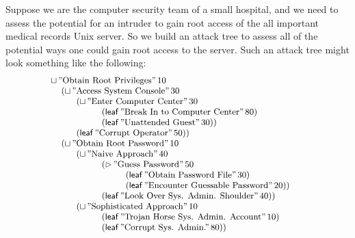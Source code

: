 \documentclass{llncs}
\begin{document}
Suppose we are the computer security team of a small hospital, and we
need to assess the potential for an intruder to gain root access of the
all important medical records Unix server.  So we build an attack tree
to assess all of the potential ways one could gain root access to the
server.  Such an attack tree might look something like the following:
\[
\small
  \begin{array}{lll}
    \sqcup\,\text{''Obtain Root Privileges''}\,10\\
    \,\,\,\,\,\,\,(\sqcup\,\text{''Access System Console''}\,30\\
    \,\,\,\,\,\,\,\,\,\,\,\,\,\,\begin{array}{lll}
    (\sqcup\,\text{''Enter Computer Center''}\,30\\
    \,\,\,\,\,\,\,\,\,\,\,\,\,\,\begin{array}{lll}
    (\mathsf{leaf}\,\text{''Break In to Computer Center''}\,80)\\
    (\mathsf{leaf}\,\text{''Unattended Guest''}\,30))\\
    \end{array}\\
    (\mathsf{leaf}\,\text{''Corrupt Operator''}\,50))\\
    \end{array}\\
    \,\,\,\,\,\,\,(\sqcup\,\text{''Obtain Root Password''}\,10\\
    \,\,\,\,\,\,\,\,\,\,\,\,\,\,\begin{array}{lll}
    (\sqcup\,\text{''Naive Approach''}\,40\\
    \,\,\,\,\,\,\,\,\,\,\,\,\,\,\begin{array}{lll}
    (\rhd\,\text{''Guess Password''}\,50\\
    \,\,\,\,\,\,\,\,\,\,\,\,\,\begin{array}{lll}
    (\mathsf{leaf}\,\text{''Obtain Password File''}\,30)\\
    (\mathsf{leaf}\,\text{''Encounter Guessable Password''}\,20))\\
    \end{array}\\
    (\mathsf{leaf}\,\text{''Look Over Sys. Admin. Shoulder''}\,40))\\
    \end{array}\\
    (\sqcup\,\text{''Sophisticated Approach''}\,10\\
    \,\,\,\,\,\,\,\,\,\,\,\,\,\,\begin{array}{lll}
    (\mathsf{leaf}\,\text{''Trojan Horse Sys. Admin. Account''}\,10)\\
    (\mathsf{leaf}\,\text{''Corrupt Sys. Admin.''}\,80))\\
    \end{array}
    \end{array}
  \end{array}
\]
\end{document}
